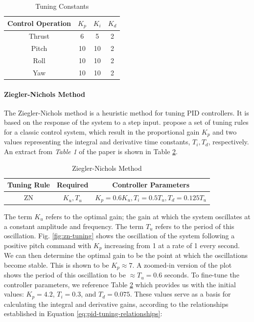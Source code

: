 \documentclass[12pt]{article}
\begin{document}
\begin{table}[ht]
    \centering
        \begin{tabular}{| c | c | c | c |} 
        \hline
        Control Operation & $K_p$ & $K_i$ & $K_d$ \\ 
        \hline
        Thrust & 6 & 5 & 2 \\
        \hline
        Pitch & 10 & 10 & 2 \\
        \hline
        Roll & 10 & 10 & 2 \\
        \hline
        Yaw & 10 & 10 & 2 \\
        \hline
        \end{tabular}
        \caption{Tuning Constants}
        \label{tab:pid-tuning}
\end{table}

\paragraph{Ziegler-Nichols Method}
The Ziegler-Nichols method is a heuristic method for tuning PID controllers. It is based on the response of the system to a step input. \citet{McCormack} propose a set of tuning rules for a classic control system, which result in the proportional gain $K_p$ and two values representing the integral and derivative time constants, $T_i,T_d$, respectively. An extract from \emph{Table 1} of the paper is shown in Table \ref{tab:zn}.

\begin{table}[ht]
    \centering
    \begin{tabular}{c|c|c}
        \hline
        Tuning Rule & Required & Controller Parameters \\
        \hline
        ZN & \(K_u, T_u\) & \(K_p = 0.6K_u, T_i = 0.5T_u, T_d = 0.125T_u\) \\
        \hline
    \end{tabular}
    \caption{Ziegler-Nichols Method}
    \label{tab:zn}
\end{table}

The term $K_u$ refers to the optimal gain; the gain at which the system oscillates at a constant amplitude and frequency. The term $T_u$ refers to the period of this oscillation. Fig. \ref{fig:zn-tuning} shows the oscillation of the system following a positive pitch command with $K_p$ increasing from 1 at a rate of 1 every second. We can then determine the optimal gain to be the point at which the oscillations become stable. This is shown to be $K_p \approx 7$. A zoomed-in version of the plot shows the period of this oscillation to be $\approx T_u = 0.6$ seconds. To fine-tune the controller parameters, we reference Table \ref{tab:zn} which provides us with the initial values: \(K_p = 4.2\), \(T_i = 0.3\), and \(T_d = 0.075\). These values serve as a basis for calculating the integral and derivative gains, according to the relationships established in Equation \ref{eq:pid-tuning-relationships}:
\end{document}
